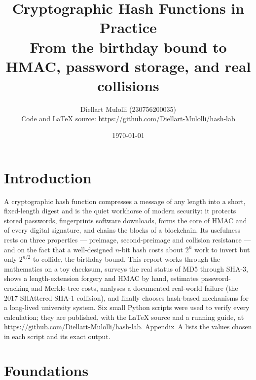 \documentclass[11pt,a4paper]{article}
\title{\textbf{Cryptographic Hash Functions in Practice}\\[0.3em]
\large From the birthday bound to HMAC, password storage, and real collisions}
\author{Diellart Mulolli (230756200035)\\[0.2em] \small Code and LaTeX source: \url{https://github.com/Diellart-Mulolli/hash-lab}}
\date{\today}
\begin{document}
\maketitle

\section*{Introduction}
A cryptographic hash function compresses a message of any length into a short, fixed-length digest and
is the quiet workhorse of modern security: it protects stored passwords, fingerprints software
downloads, forms the core of HMAC and of every digital signature, and chains the blocks of a
blockchain. Its usefulness rests on three properties --- preimage, second-preimage and collision
resistance --- and on the fact that a well-designed $n$-bit hash costs about $2^n$ work to invert but
only $2^{n/2}$ to collide, the birthday bound. This report works through the mathematics on a toy
checksum, surveys the real status of MD5 through SHA-3, shows a length-extension forgery and HMAC by
hand, estimates password-cracking and Merkle-tree costs, analyses a documented real-world failure (the
2017 SHAttered SHA-1 collision), and finally chooses hash-based mechanisms for a long-lived university
system. Six small Python scripts were used to verify every calculation; they are published, with the
LaTeX source and a running guide, at \url{https://github.com/Diellart-Mulolli/hash-lab}. Appendix~A
lists the values chosen in each script and its exact output.

\section*{Foundations}
\end{document}
